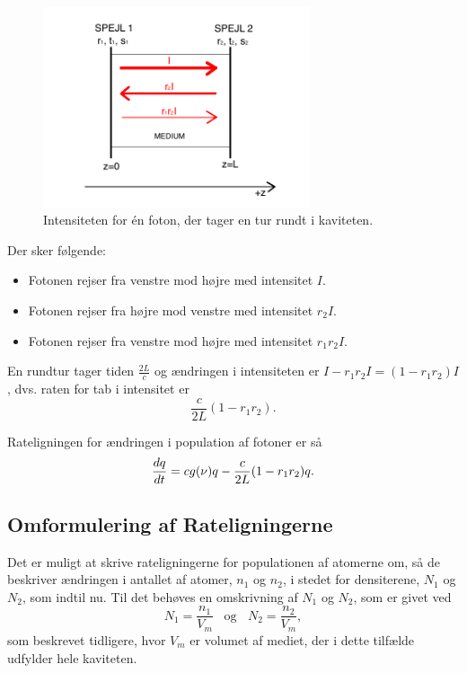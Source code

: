 \begin{figure}[h!]
  \centering
  \includegraphics[width=0.7\textwidth]{Laserfysik/intensitettab.png}
  \caption{Intensiteten for én foton, der tager en tur rundt i kaviteten.}
  \label{fig:intensitettab}
\end{figure}

Der sker følgende:
\begin{itemize}
\item Fotonen rejser fra venstre mod højre med intensitet $I$. 
\item Fotonen rejser fra højre mod venstre med intensitet $r_2I$.
\item Fotonen rejser fra venstre mod højre med intensitet $r_1r_2I$.
\end{itemize}

En rundtur tager tiden $\frac{2L}{c}$ og ændringen i intensiteten er $I-r_1r_2I = (1-r_1r_2)I$, dvs. raten for tab i intensitet er 
\begin{equation}
\frac{c}{2L}(1-r_1r_2).
\end{equation}

Rateligningen for ændringen i population af fotoner er så 
\begin{equation}
{d{q} \over d{t}} = cg(\nu)q - \frac{c}{2L}(1-r_1r_2)q.
\end{equation}

\subsection{Omformulering af Rateligningerne}
Det er muligt at skrive rateligningerne for populationen af atomerne om, så de beskriver ændringen i antallet af atomer, $n_1$ og $n_2$, i stedet for densiterene, $N_1$ og $N_2$, som indtil nu. 
Til det behøves en omskrivning af $N_1$ og $N_2$, som er givet ved 
\begin{equation}
N_1 = \frac{n_1}{V_m} \,\,\,\,\, \text{og} \,\,\,\,\ N_2 = \frac{n_2}{V_m},
\end{equation}
som beskrevet tidligere, hvor $V_m$ er volumet af mediet, der i dette tilfælde udfylder hele kaviteten. 

